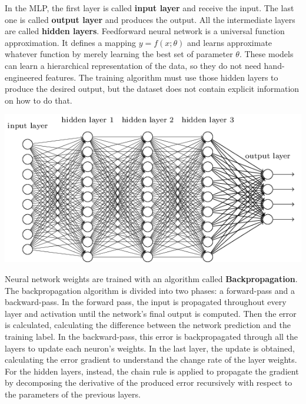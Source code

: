 In the MLP, the first layer is called \textbf{input layer} and receive the input.
The last one is called \textbf{output layer} and produces the output. 
All the intermediate layers are called \textbf{hidden layers}.
Feedforward neural network is a universal function approximation.
It defines a mapping $y = f(x;\theta)$ and learns approximate whatever function by merely learning the best set of parameter $\theta$.
These models can learn a hierarchical representation of the data, so they do not need hand-engineered features.
The training algorithm must use those hidden layers to produce the desired output, but the dataset does not contain explicit information on how to do that.\\

\begin{minipage}{\linewidth}
            \centering
            \includegraphics[width=.8\textwidth]{pictures/neural_network}
\end{minipage}


Neural network weights are trained with an algorithm called \textbf{Backpropagation}. The backpropagation algorithm is divided into two phases: a forward-pass and a backward-pass.
In the forward pass, the input is propagated throughout every layer and activation until the network's final output is computed. Then the error is calculated, calculating the difference between the network prediction and the training label. In the backward-pass, this error is backpropagated through all the layers to update each neuron's weights.  In the last layer, the update is obtained, calculating the error gradient to understand the change rate of the layer weights. For the hidden layers, instead, the chain rule is applied to propagate the gradient by decomposing the derivative of the produced error recursively with respect to the parameters of the previous layers. 
\\

